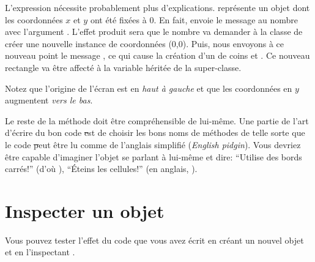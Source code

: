 \documentclass[a4paper,10pt,twoside]{book}
\begin{document}
L'expression  nécessite probablement plus d'explications.
 représente un objet  dont les coordonnées $x$ et $y$ ont été fixées à 0.
En fait,  envoie le message %
au nombre  avec l'argument .
L'effet produit sera que le nombre  va demander à la classe  de créer une nouvelle instance de coordonnées (0,0).
Puis, nous envoyons à ce nouveau point le message , ce qui cause la création d'un  de coins  et .
Ce nouveau rectangle va être affecté à la variable  héritée de la super-classe.

Notez que l'origine de l'écran \pharo est en \emph{haut à gauche} et que les coordonnées en $y$ augmentent \emph{vers le bas}.

Le reste de la méthode doit être compréhensible de lui-même.
Une partie de l'art d'écrire du bon code \st est de choisir les bons
noms de méthodes de telle sorte que le code \st peut être lu comme
de l'anglais simplifié (\emph{English pidgin}).  
Vous devriez être capable d'imaginer l'objet se parlant à lui-même et
dire:  ``Utilise des bords carrés!'' (d'où ),
``Éteins les cellules!'' (en anglais, ).

\section{Inspecter un objet}

Vous pouvez tester l'effet du code que vous avez écrit en créant un
nouvel objet  et en l'inspectant
.

\end{document}
